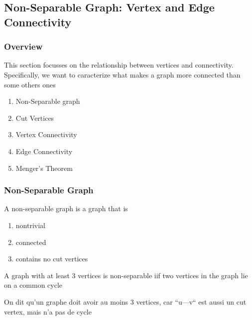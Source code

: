 \documentclass{article}
\begin{document}
\subsection{Non-Separable Graph: Vertex and Edge Connectivity}%
\label{sub:Vertices Cut}

\subsubsection{Overview}%
\label{ssub:Overview}

This section focusses on the relationship between vertices and connectivity.
Specifically, we want to caracterize what makes a graph more connected than
some others ones

\begin{enumerate}
    \item Non-Separable graph
    \item Cut Vertices
    \item Vertex Connectivity
    \item Edge Connectivity
    \item Menger's Theorem
\end{enumerate}

\subsubsection{Non-Separable Graph}%
\label{ssub:Non-Separable Graph}

\begin{definition}
    A non-separable graph is a graph that is
    \begin{enumerate}
        \item nontrivial
	\item connected
	\item contains no cut vertices
    \end{enumerate}
\end{definition}

\begin{theorem}
    A graph with at least 3 vertices is non-separable iif two vertices in
    the graph lie on a common cycle
\end{theorem}

\begin{remark}
    On dit qu'un graphe doit avoir au moins 3 vertices, car ``u---v`` est
    aussi un cut vertex, mais n'a pas de cycle
\end{remark}
\end{document}
